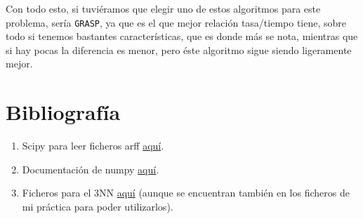 \documentclass[12pt]{article}
\begin{document}
Con todo esto, si tuviéramos que elegir uno de estos algoritmos para este problema, sería \texttt{GRASP}, ya que es el que mejor relación tasa/tiempo tiene, sobre todo si tenemos bastantes características, que es donde más se nota, mientras que si hay pocas la diferencia es menor, pero éste algoritmo sigue siendo ligeramente mejor.

\section{Bibliografía}
\begin{enumerate}
\item Scipy para leer ficheros arff \href{arff http://docs.scipy.org/doc/scipy/reference/generated/scipy.io.arff.loadarff.html}{aquí}.
\item Documentación de numpy \href{http://docs.scipy.org/doc/numpy/user/index.html}{aquí}.
\item Ficheros para el 3NN \href{https://github.com/agarciamontoro/metaheuristics/tree/master/src/knnGPU}{aquí} (aunque se encuentran también en los ficheros de mi práctica para poder utilizarlos).
\end{enumerate}
\end{document}
